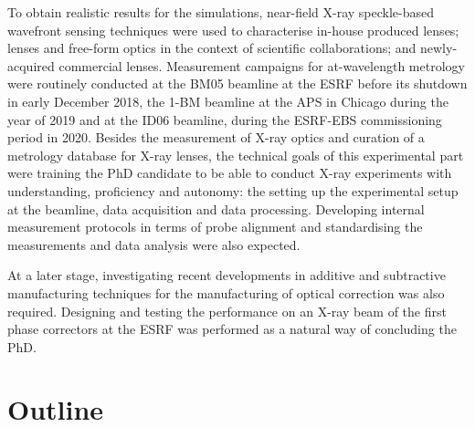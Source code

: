 To obtain realistic results for the simulations, near-field X-ray speckle-based wavefront sensing techniques were used to characterise in-house produced lenses; lenses and free-form optics in the context of scientific collaborations; and newly-acquired commercial lenses. Measurement campaigns for at-wavelength metrology were routinely conducted at the BM05 beamline at the ESRF before its shutdown in early December 2018, the 1-BM beamline at the APS in Chicago during the year of 2019 and at the ID06 beamline, during the ESRF-EBS commissioning period in 2020. Besides the measurement of X-ray optics and curation of a metrology database for X-ray lenses, the technical goals of this experimental part were training the PhD candidate to be able to conduct X-ray experiments with understanding, proficiency and autonomy: the setting up the experimental setup at the beamline, data acquisition and data processing. Developing internal measurement protocols in terms of probe alignment and standardising the measurements and data analysis were also expected. 

At a later stage, investigating recent developments in additive and subtractive manufacturing techniques for the manufacturing of optical correction was also required. Designing and testing the performance on an X-ray beam of the first phase correctors at the ESRF was performed as a natural way of concluding the PhD.

\section*{Outline}

